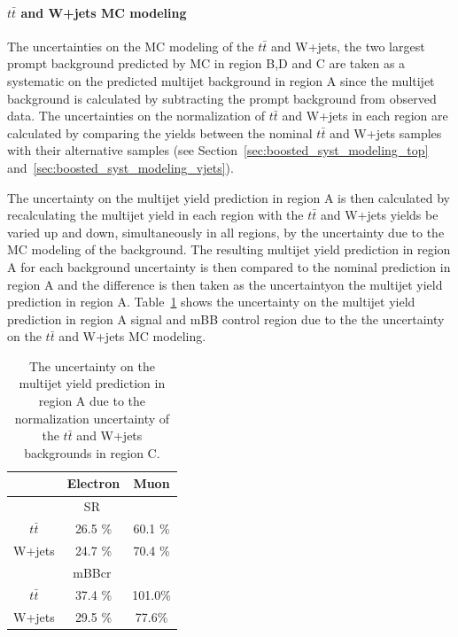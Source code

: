 \paragraph{$t\bar{t}$ and W+jets MC modeling}
 The uncertainties on the MC modeling
of the $t\bar{t}$ and W+jets, the two largest prompt background predicted by MC in region B,D and C
are taken as a systematic on the predicted multijet background in region A since the multijet
background is calculated by subtracting the prompt background from observed data. The uncertainties
on the normalization of $t\bar{t}$ and W+jets in each region are calculated by comparing the yields
between the nominal $t\bar{t}$ and W+jets samples with their alternative samples
(see Section~\ref{sec:boosted_syst_modeling_top} and~\ref{sec:boosted_syst_modeling_vjets}).
 
The uncertainty on the multijet yield prediction in region A is then calculated
by recalculating the multijet yield in each region with the $t\bar{t}$ and W+jets
yields be varied up and down, simultaneously in all regions, by the uncertainty due to the
MC modeling of the background. The resulting multijet yield prediction in region A for
each background uncertainty is then compared to the nominal prediction in region A and the difference is
then taken as the uncertaintyon the multijet yield prediction in region A.
Table~\ref{tab:boosted_syst_qcd_norm_ttbarwjetsregionc} shows the uncertainty on the multijet yield prediction
in region A signal and mBB control region  due to the the uncertainty on the $t\bar{t}$ and W+jets
MC modeling.
 
\begin{table}[!htbp]
\begin{center}
\begin{tabular}{c|c|c}
& Electron  & Muon  \\  
\hline
\multicolumn{3}{c}{SR} \\
\hline
$t\bar{t}$           &     26.5 \% &   60.1 \%  \\
W+jets               &     24.7 \% &   70.4 \%  \\
\hline
\multicolumn{3}{c}{mBBcr} \\
\hline
$t\bar{t}$           &  37.4  \%  &   101.0\%  \\
W+jets               &  29.5  \%  &   77.6\%   \\
\hline
\end{tabular}
\end{center}
\caption[The uncertainty on the multijet yield prediction in region A]{The uncertainty on the multijet yield prediction in region A due to the normalization
uncertainty of the $t\bar{t}$ and W+jets backgrounds in region C.}
\label{tab:boosted_syst_qcd_norm_ttbarwjetsregionc}
\end{table}
 
